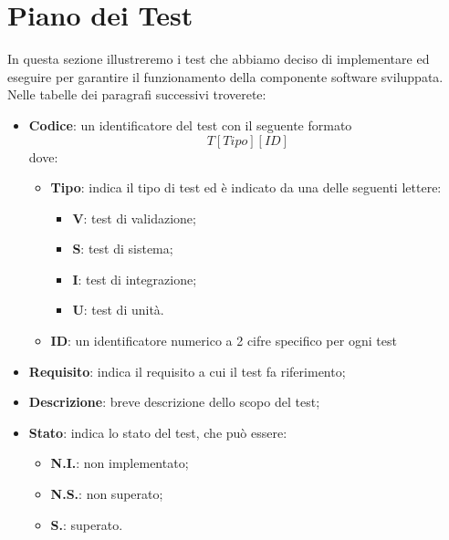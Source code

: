 \section{Piano dei Test}

In questa sezione illustreremo i test che abbiamo deciso di implementare ed eseguire per garantire il funzionamento della componente software sviluppata.
\newline
Nelle tabelle dei paragrafi successivi troverete:
\begin{itemize}
    \item \textbf{Codice}: un identificatore del test con il seguente formato
    \[
        T[Tipo][ID]
    \]
    dove:
    \begin{itemize}
        \item \textbf{Tipo}: indica il tipo di test ed è indicato da una delle seguenti lettere:
        \begin{itemize}
            \item \textbf{V}: test di validazione;
            \item \textbf{S}: test di sistema;
            \item \textbf{I}: test di integrazione;
            \item \textbf{U}: test di unità.
        \end{itemize}
        \item \textbf{ID}: un identificatore numerico a 2 cifre specifico per ogni test
    \end{itemize}
    \item \textbf{Requisito}: indica il requisito a cui il test fa riferimento; 
    \item \textbf{Descrizione}: breve descrizione dello scopo del test;
    \item \textbf{Stato}: indica lo stato del test, che può essere:
    \begin{itemize}
        \item \textbf{N.I.}: non implementato;
        \item \textbf{N.S.}: non superato;
        \item \textbf{S.}: superato.
    \end{itemize}
\end{itemize}
\newpage

\clearpage

\newpage

\newpage
